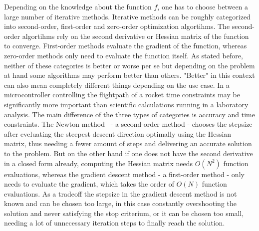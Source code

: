 \documentclass[a4paper,10pt]{article}
\begin{document}
    Depending on the knowledge about the function $f$, one has to choose
    between a large number of iterative methods.
    Iterative methods can be roughly categorized into second-order, 
    first-order and zero-order optimization algortihms.
    The second-order algortihms rely on the second derivative or
    Hessian matrix of the function to converge.
    First-order methods evaluate the gradient of the function, whereas
    zero-order methods only need to evaluate the function itself.
    As stated before, neither of these categories is better or worse
    per se but depending on the problem at hand some algorithms
    may perform better than others.
    "Better" in this context can also mean completely different things
    depending on the use case.
    In a microcontroller controlling the flightpath of a rocket
    time constraints may be significantly more important than
    scientific calculations running in a laboratory analysis.
    The main difference of the three types of categories is accuracy
    and time constraints.
    The Newton method~\cite{solomon_numerical} - a second-order method -
    chooses the stepsize after eveluating the steepest descent
    direction optimally using the Hessian matrix, thus needing
    a fewer amount of steps and delivering an accurate solution to
    the problem.
    But on the other hand if one does not have the second derivative
    in a closed form already,
    computing the Hessian matrix needs $O(N^2)$
    function evaluations, whereas the gradient descent method
    - a first-order method - only needs to evaluate the gradient, which
    takes the order of $O(N)$ function evaluations.
    As a tradeoff the stepsize in the gradient descent method is not
    known and can be chosen too large, in this case constantly
    overshooting the solution and never satisfying the stop
    criterium, or it can be chosen too small, needing a lot of
    unnecessary iteration steps to finally reach the solution.
    
\end{document}
